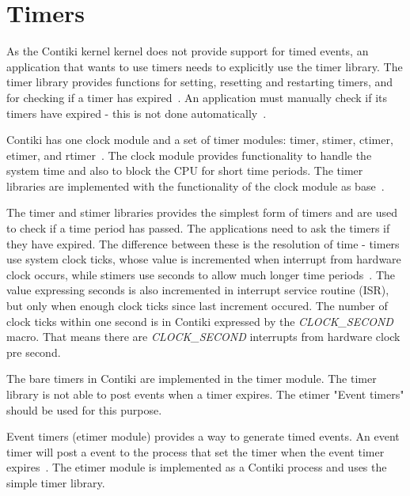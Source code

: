 
\section{Timers}\label{sec:contiki-timers}
As the Contiki kernel kernel does not provide support for timed events,
an application that wants to use timers needs to explicitly use the timer library.
The timer library provides functions for setting, resetting and restarting timers,
and for checking if a timer has expired~\cite{contiki-docs}.
An application must manually check if its timers have expired - this is not done automatically~\cite{contiki-docs}.

Contiki has one clock module and a set of timer modules: timer, stimer, ctimer, etimer, and rtimer~\cite{contiki-wiki-timers}.
The clock module provides functionality to handle the system time and also to block the CPU for short time periods.
The timer libraries are implemented with the functionality of the clock module as base~\cite{contiki-wiki-timers}.

The timer and stimer libraries provides the simplest form of timers and are used to check if a time period has passed.
The applications need to ask the timers if they have expired.
The difference between these is the resolution of time -
timers use system clock ticks, whose value is incremented when interrupt from hardware clock occurs,
while stimers use seconds to allow much longer time periods~\cite{contiki-wiki-timers}.
The value expressing seconds is also incremented in interrupt service routine (ISR),
but only when enough clock ticks since last increment occured.
The number of clock ticks within one second is in Contiki expressed by the {\it{CLOCK\_SECOND}} macro.
That means there are {\it{CLOCK\_SECOND}} interrupts from hardware clock pre second.

The bare timers in Contiki are implemented in the timer module.
The timer library is not able to post events when a timer
expires. The etimer "Event timers" should be used for this
purpose.


Event timers (etimer module) provides a way to generate timed events.
An event timer will post a event to the process that set the timer when the
event timer expires~\cite{contiki-docs}.
The etimer module is implemented as a Contiki process and uses the simple timer library.

